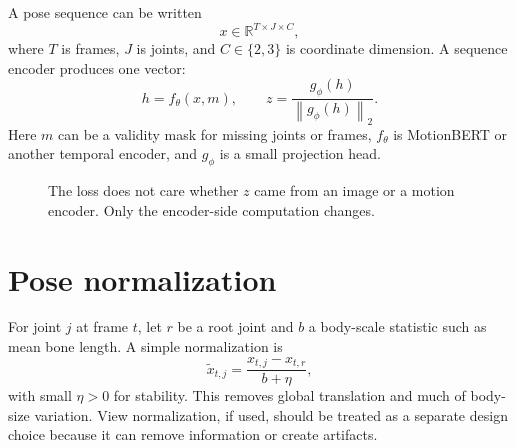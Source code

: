 \documentclass[11pt,oneside,openany]{book}
\theoremstyle{myplain}
\theoremstyle{definition}
\newcommand{\R}{\mathbb{R}}
\newcommand{\norm}[1]{\left\lVert #1\right\rVert}
\begin{document}
A pose sequence can be written
\begin{equation}
  x\in\R^{T\times J\times C},
  \label{eq:pose-tensor}
\end{equation}
where $T$ is frames, $J$ is joints, and $C\in\{2,3\}$ is coordinate dimension. A sequence encoder produces one vector:
\begin{equation}
  h=f_\theta(x,m),\qquad
  z=\frac{g_\phi(h)}{\norm{g_\phi(h)}_2}.
  \label{eq:pose-encoder}
\end{equation}
Here $m$ can be a validity mask for missing joints or frames, $f_\theta$ is MotionBERT or another temporal encoder, and $g_\phi$ is a small projection head.

\begin{figure}[H]
\centering
{}
\caption{The loss does not care whether $z$ came from an image or a motion encoder. Only the encoder-side computation changes.}
\label{fig:pose-encoder}
\end{figure}

\section{Pose normalization}

For joint $j$ at frame $t$, let $r$ be a root joint and $b$ a body-scale statistic such as mean bone length. A simple normalization is
\begin{equation}
  \tilde x_{t,j}=\frac{x_{t,j}-x_{t,r}}{b+\eta},
  \label{eq:pose-normalize}
\end{equation}
with small $\eta>0$ for stability. This removes global translation and much of body-size variation. View normalization, if used, should be treated as a separate design choice because it can remove information or create artifacts.
\end{document}
